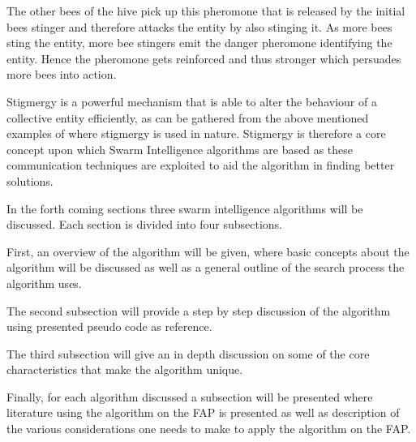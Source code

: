 The other bees of the hive pick up this pheromone that is released by the initial bees stinger and therefore attacks the entity by also stinging it\cite{stigmergicoptimization}. As more bees sting the entity, more bee stingers emit the danger pheromone identifying the entity\cite{stigmergicoptimization}. Hence the pheromone gets reinforced and thus stronger which persuades more bees into action\cite{stigmergicoptimization}.

Stigmergy is a powerful mechanism that is able to alter the behaviour of a collective entity efficiently, as can be gathered from the above mentioned examples of where stigmergy is used in nature\cite{AntsAndStigmergy,CompuIntelligenceIntro,AntIntroTrends}. Stigmergy is therefore a core concept upon which Swarm Intelligence algorithms are based as these communication techniques are exploited to aid the algorithm in finding better solutions\cite{AntsAndStigmergy,CompuIntelligenceIntro,AntIntroTrends}.

In the forth coming sections three swarm intelligence algorithms will be discussed. Each section is divided into four subsections. 

First, an overview of the algorithm will be given, where basic concepts about the algorithm will be discussed as well as a general outline of the search process the algorithm uses. 

The second subsection will provide a step by step discussion of the algorithm using presented pseudo code as reference.

The third subsection will give an in depth discussion on some of the core characteristics that make the algorithm unique. 

Finally, for each algorithm discussed a subsection will be presented where literature using the algorithm on the FAP is presented as well as description of the various considerations one needs to make to apply the algorithm on the FAP.

